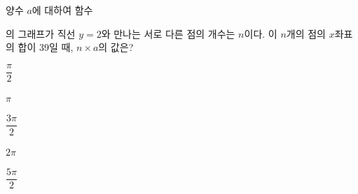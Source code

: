 양수 $a$에 대하여 함수 \par\smallskip{}\par\smallskip\noindent 의 그래프가 직선 $y=2$와 만나는 서로 다른 점의 개수는 \mbox{$n$이다.} 이 $n$개의 점의 $x$좌표의 합이 $39$일 때, $n\times a$의 값은?
\begin{choices32}{\rule[-3ex]{0pt}{8ex}$\dfrac{\pi}{2}$}{\rule[-3ex]{0pt}{8ex}$\pi$}{\rule[-3ex]{0pt}{8ex}$\dfrac{3\pi}{2}$}{\rule[-3ex]{0pt}{8ex}$2\pi$}{\rule[-3ex]{0pt}{8ex}$\dfrac{5\pi}{2}$}\end{choices32}
